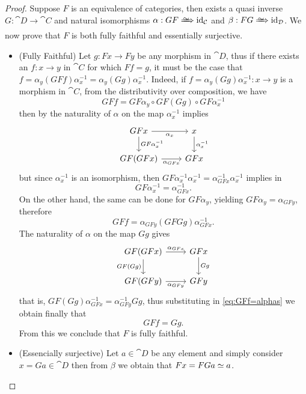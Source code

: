 \begin{proof}
Suppose \(F\) is an equivalence of categories, then exists a quasi inverse
\(G: \cat D \to \cat C\) and natural isomorphisms
\(\alpha: G F \isonat \Id_{\cat C}\) and \(\beta: F G \isonat \Id_{\cat D}\). We
now prove that \(F\) is both fully faithful and essentially surjective.

\begin{itemize}\setlength\itemsep{0em}
\item (Fully Faithful) Let \(g: Fx \to Fy\) be any morphism in \(\cat D\), thus
  if there exists an \(f: x \to y\) in \(\cat C\) for which \(F f = g\), it must
  be the case that
  \(f = \alpha_y (G F f) \alpha_x^{-1} = \alpha_y (G g) \alpha_x^{-1}\). Indeed,
  if \(f = \alpha_y (G g) \alpha_x^{-1}: x \to y\) is a morphism in \(\cat C\),
  from the distributivity over composition, we have
  \[
  G F f = G F \alpha_y \circ G F (G g) \circ G F \alpha_x^{-1}
  \]
  then by the naturality of \(\alpha\) on the map \(\alpha_x^{-1}\) implies
  \[
  \begin{tikzcd}
  G F x \ar[d, "G F \alpha_x^{-1}"] \ar[r, "\alpha_x"']
  & x \ar[d, "\alpha_x^{-1}"] \\
  G F (G F x) \ar[r, "\alpha_{G F x}"'] & G F x
  \end{tikzcd}
  \]
  but since \(\alpha_x^{-1}\) is an isomorphism, then
  \(G F \alpha_x^{-1} \alpha_x^{-1} = \alpha_{G F x}^{-1} \alpha_x^{-1}\)
  implies in
  \[
  G F \alpha_x^{-1} = \alpha_{G F x}^{-1}.
  \]
  On the other hand, the same can be done for \(G F \alpha_y\), yielding
  \(G F \alpha_y = \alpha_{G F y}\), therefore
  \begin{equation}\label{eq:GFf=alphas}
  G F f = \alpha_{G F y} (G F G g) \alpha_{G F x}^{-1}.
  \end{equation}
  The naturality of \(\alpha\) on the map \(G g\) gives
  \[
  \begin{tikzcd}
  G F (G F x) \ar[r, "\alpha_{G F x}"] \ar[d, "G F (G g)"']
  & G F x \ar[d, "G g"] \\
  G F (G F y) \ar[r, "\alpha_{G F y}"'] & G F y
  \end{tikzcd}
  \]
  that is, \(G F (G g) \alpha_{G F x}^{-1} = \alpha_{G F y}^{-1} G g\), thus
  substituting in \cref{eq:GFf=alphas} we obtain finally that
  \[
  G F f = G g.
  \]
  From this we conclude that \(F\) is fully faithful.

\item (Essencially surjective) Let \(a \in \cat D\) be any element and simply
  consider \(x = G a \in \cat D\) then from \(\beta\) we obtain that
  \(Fx = F G a \simeq a\).
\end{itemize}


\end{proof}
